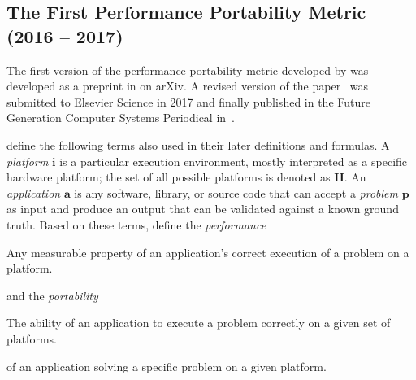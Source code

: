 \subsection{The First Performance Portability Metric \pp (2016 -- 2017)}
\label{sec:first_pp_metric}

The first version of the performance portability metric developed by \citet{pennycook_metric_2016} was developed as a preprint in \citeyear{pennycook_metric_2016} on arXiv. 
A revised version of the paper~\cite{pennycook_implications_2019} was submitted to Elsevier Science in 2017 and finally published in the Future Generation Computer Systems Periodical in~\citeyear{pennycook_implications_2019}. 

\citeauthor{pennycook_implications_2019} define the following terms also used in their later definitions and formulas. 
A \textit{platform} $\mathbf{i}$ is a particular execution environment, mostly interpreted as a specific hardware platform; the set of all possible platforms is denoted as $\mathbf{H}$. 
An \textit{application} $\mathbf{a}$ is any software, library, or source code that can accept a \textit{problem} $\mathbf{p}$ as input and produce an output that can be validated against a known ground truth. 
Based on these terms, \citeauthor{pennycook_implications_2019} define the \textit{performance}  
\begin{quotebox}{\citet{pennycook_implications_2019}}
    Any measurable property of an application’s correct execution of a problem on a platform.
\end{quotebox}
and the \textit{portability} 
\begin{quotebox}{\citet{pennycook_implications_2019}}
    The ability of an application to execute a problem correctly on a given set of platforms.
\end{quotebox}
of an application solving a specific problem on a given platform. 

